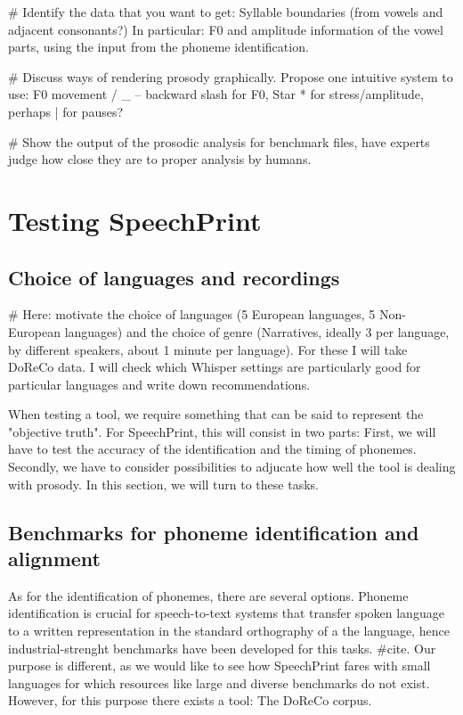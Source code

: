 # Identify the data that you want to get: Syllable boundaries (from vowels and adjacent consonants?) In particular: F0 and amplitude information of the vowel parts, using the input from the phoneme identification. 

# Discuss ways of rendering prosody graphically. Propose one intuitive system to use: F0 movement / _ -- backward slash for F0, Star * for stress/amplitude, perhaps | for pauses?

# Show the output of the prosodic analysis for benchmark files, have experts judge how close they are to proper analysis by humans. 

\chapter{Testing SpeechPrint}
\label{testing}

\section{Choice of languages and recordings}

# Here: motivate the choice of languages (5 European languages, 5 Non-European languages) and the choice of genre (Narratives, ideally 3 per language, by different speakers, about 1 minute per language). For these I will take DoReCo data. I will check which Whisper settings are particularly good for particular languages and write down recommendations. 

When testing a tool, we require something that can be said to represent the "objective truth". For SpeechPrint, this will consist in two parts: First, we will have to test the accuracy of the identification and the timing of phonemes. Secondly, we have to consider possibilities to adjucate how well the tool is dealing with prosody. In this section, we will turn to these tasks. 

\section{Benchmarks for phoneme identification and alignment}

As for the identification of phonemes, there are several options. Phoneme identification is crucial for speech-to-text systems that transfer spoken language to a written representation in the standard orthography of a the language, hence industrial-strenght benchmarks have been developed for this tasks. #cite. Our purpose is different, as we would like to see how SpeechPrint fares with small languages for which resources like large and diverse benchmarks do not exist. However, for this purpose there exists a tool: The DoReCo corpus. 


